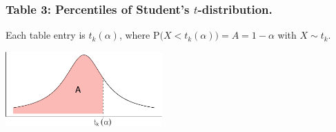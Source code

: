 \documentclass[]{article}
\begin{document}
\hypertarget{table-3-percentiles-of-students-t-distribution.}{%
\subsubsection{\texorpdfstring{Table 3: Percentiles of Student's
\(t\)-distribution.}{Table 3: Percentiles of Student's t-distribution.}}\label{table-3-percentiles-of-students-t-distribution.}}

Each table entry is \(t_k(\alpha)\), where
\(\text{P}\big(X < t_k(\alpha)\big)=A=1-\alpha\) with \(X\sim t_k\).

\vspace{1em}

\begin{center}\includegraphics[width=6cm]{stat-tables_files/figure-latex/unnamed-chunk-4-1} \end{center}
\end{document}
